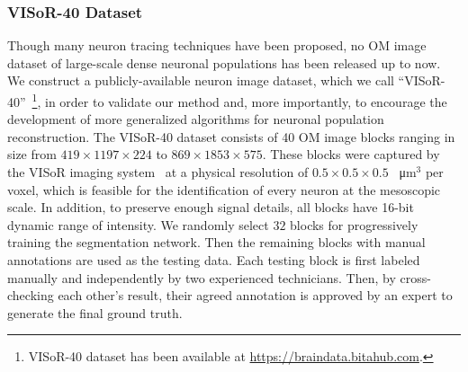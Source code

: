 \subsubsection{VISoR-40 Dataset}
Though many neuron tracing techniques have been proposed, no OM image dataset of large-scale dense neuronal populations has been released up to now.
We construct a publicly-available neuron image dataset, which we call ``VISoR-40''~\footnote{VISoR-40 dataset has been available at \url{https://braindata.bitahub.com}.}, in order to validate our method and, more importantly, to encourage the development of more generalized algorithms for neuronal population reconstruction.
The VISoR-40 dataset consists of 40 OM image blocks ranging in size from $419 \times1197 \times 224$ to $869 \times1853 \times 575$.
These blocks were captured by the VISoR imaging system~\cite{Wang2019} at a physical resolution of $0.5 \times0.5 \times 0.5$ \SI{}{\micro\metre}$^3$ per voxel, which is feasible for the identification of every neuron at the mesoscopic scale.
In addition, to preserve enough signal details, all blocks have 16-bit dynamic range of intensity.
We randomly select $ 32 $ blocks for progressively training the segmentation network.
Then the remaining blocks with manual annotations are used as the testing data.
Each testing block is first labeled manually and independently by two experienced technicians. Then, by cross-checking each other's result, their agreed annotation is approved by an expert to generate the final ground truth.

